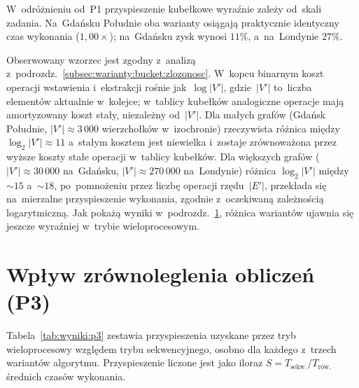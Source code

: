 W~odróżnieniu od~P1 przyspieszenie kubełkowe wyraźnie zależy od~skali
zadania. Na~Gdańsku Południe oba warianty osiągają praktycznie identyczny
czas wykonania ($1{,}00\times$); na~Gdańsku zysk wynosi $11\%$, a~na~Londynie
$27\%$.

Obserwowany wzorzec jest zgodny z~analizą z~podrozdz.~\ref{subsec:warianty:bucket:zlozonosc}.
W~kopcu binarnym koszt operacji wstawienia i~ekstrakcji rośnie jak~$\log|V'|$,
gdzie~$|V'|$ to~liczba elementów aktualnie w~kolejce; w~tablicy kubełków
analogiczne operacje mają amortyzowany koszt stały, niezależny od~$|V'|$.
Dla małych grafów (Gdańsk Południe, $|V'|\approx 3\,000$ wierzchołków
w~izochronie) rzeczywista różnica między $\log_2|V'|\approx 11$ a~stałym
kosztem jest niewielka i~zostaje zrównoważona przez wyższe koszty stałe
operacji w~tablicy kubełków. Dla większych grafów ($|V'|\approx 30\,000$
na~Gdańsku, $|V'|\approx 270\,000$ na~Londynie) różnica $\log_2|V'|$
między $\sim 15$ a~$\sim 18$, po~pomnożeniu przez liczbę operacji rzędu~$|E'|$,
przekłada się na~mierzalne przyspieszenie wykonania, zgodnie z~oczekiwaną
zależnością logarytmiczną. Jak pokażą wyniki w~podrozdz.~\ref{sec:wyniki:p3},
różnica wariantów ujawnia się jeszcze wyraźniej w~trybie wieloprocesowym.

\clearpage

\section{Wpływ zrównoleglenia obliczeń (P3)}
\label{sec:wyniki:p3}

Tabela~\ref{tab:wyniki:p3} zestawia przyspieszenia uzyskane przez tryb
wieloprocesowy względem trybu sekwencyjnego, osobno dla każdego z~trzech
wariantów algorytmu. Przyspieszenie liczone jest jako iloraz
$S=T_{\text{sekw.}}/T_{\text{rów.}}$ średnich czasów wykonania.


